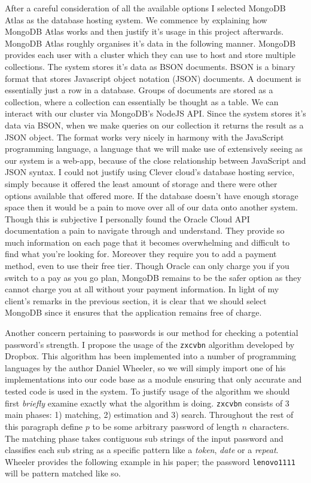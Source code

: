 After a careful consideration of all the available options
I selected MongoDB Atlas as the database hosting system. We
commence by explaining how MongoDB Atlas works and then
justify it's usage in this project afterwards. MongoDB Atlas
roughly organises it's data in the following manner. MongoDB
provides each user with a cluster which they can use to host
and store multiple collections. The system stores it's data
as BSON documents. BSON is a binary format that stores
Javascript object notation (JSON) documents. A document is
essentially just a row in a database. Groups of documents
are stored as a collection, where a collection can
essentially be thought as a table. We can interact with our
cluster via MongoDB's NodeJS API. Since the system stores
it's data via BSON, when we make queries on our collection it
returns the result as a JSON object. The format works very
nicely in harmony with the JavaScript programming language,
a language that we will make use of extensively seeing as our
system is a web-app, because of the close relationship
between JavaScript and JSON syntax. I could not justify using
Clever cloud's database hosting service, simply because it
offered the least amount of storage and there were other
options available that offered more. If the database doesn't
have enough storage space then it would be a pain to move over
all of our data onto another system. Though this is subjective
I personally found the Oracle Cloud API documentation a pain
to navigate through and understand. They provide so much
information on each page that it becomes overwhelming and
difficult to find what you're looking for. Moreover they
require you to add a payment method, even to use their free
tier. Though Oracle can only charge you if you switch to a
pay as you go plan, MongoDB remains to be the safer option
as they cannot charge you at all without your payment
information. In light of my client's remarks in the previous
section, it is clear that we should select MongoDB since
it ensures that the application remains free of charge.
\\ \vspace{0.2cm}

Another concern pertaining to passwords is our method for
checking a potential password's strength. I propose the usage
of the \texttt{zxcvbn} algorithm \cite{pass} developed by
Dropbox. This algorithm has been implemented into a number of
programming languages by the author Daniel Wheeler, so we will
simply import one of his implementations into our code base as
a module ensuring that only accurate and tested code is used
in the system. To justify usage of the algorithm we should
first \textit{briefly} examine exactly what the algorithm is
doing. \texttt{zxcvbn} consists of 3 main phases: 1) matching,
2) estimation and 3) search. Throughout the rest of this
paragraph define $p$ to be some arbitrary password of length
$n$ characters. The matching phase takes contiguous
sub strings of the input password and classifies
each sub string as a specific pattern like a \textit{token},
\textit{date} or a \textit{repeat}. Wheeler provides the
following example in his paper; the password
\texttt{lenovo1111} will be pattern matched like so.

